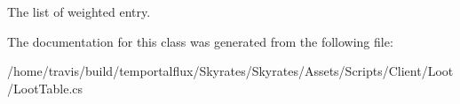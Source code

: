 The list of weighted entry. 



The documentation for this class was generated from the following file\-:\begin{DoxyCompactItemize}
\item 
/home/travis/build/temportalflux/\-Skyrates/\-Skyrates/\-Assets/\-Scripts/\-Client/\-Loot/Loot\-Table.\-cs\end{DoxyCompactItemize}
